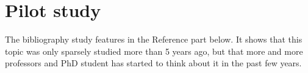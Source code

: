 \documentclass[a4paper]{article}
\begin{document}
\section{Pilot study}

The bibliography study features in the Reference part below. It shows that this topic was only sparsely studied more than 5 years ago, but that more and more professors and PhD student has started to think about it in the past few years.

\nocite{lime}
\nocite{mythos}
\nocite{treeinterpreter}
\nocite{explvect}
\nocite{gametheory}
\nocite{euregulation}
\nocite{healthcare}
\nocite{trust}
\nocite{documentclassif}
\nocite{explainingclassif}
\nocite{ice}
\nocite{evolutionnary}
\nocite{interpretingusing}
\nocite{breastcancer}
\nocite{sensitivity}

\printbibliography
\end{document}
